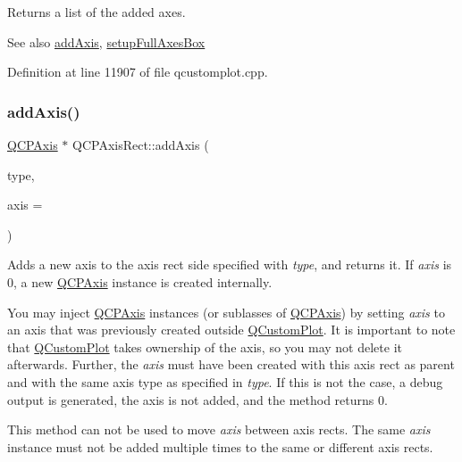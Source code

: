 Returns a list of the added axes.

\begin{DoxySeeAlso}{See also}
\hyperlink{class_q_c_p_axis_rect_a2dc336092ccc57d44a46194c8a23e4f4}{add\+Axis}, \hyperlink{class_q_c_p_axis_rect_a5fa906175447b14206954f77fc7f1ef4}{setup\+Full\+Axes\+Box} 
\end{DoxySeeAlso}


Definition at line 11907 of file qcustomplot.\+cpp.

\mbox{\label{class_q_c_p_axis_rect_a2dc336092ccc57d44a46194c8a23e4f4}} 
\subsubsection{\texorpdfstring{add\+Axis()}{addAxis()}}
{\footnotesize\ttfamily \hyperlink{class_q_c_p_axis}{Q\+C\+P\+Axis} $\ast$ Q\+C\+P\+Axis\+Rect\+::add\+Axis (\begin{DoxyParamCaption}\item[{\hyperlink{class_q_c_p_axis_ae2bcc1728b382f10f064612b368bc18a}{Q\+C\+P\+Axis\+::\+Axis\+Type}}]{type,  }\item[{\hyperlink{class_q_c_p_axis}{Q\+C\+P\+Axis} $\ast$}]{axis = {} }\end{DoxyParamCaption})}

Adds a new axis to the axis rect side specified with {\itshape type}, and returns it. If {\itshape axis} is 0, a new \hyperlink{class_q_c_p_axis}{Q\+C\+P\+Axis} instance is created internally.

You may inject \hyperlink{class_q_c_p_axis}{Q\+C\+P\+Axis} instances (or sublasses of \hyperlink{class_q_c_p_axis}{Q\+C\+P\+Axis}) by setting {\itshape axis} to an axis that was previously created outside \hyperlink{class_q_custom_plot}{Q\+Custom\+Plot}. It is important to note that \hyperlink{class_q_custom_plot}{Q\+Custom\+Plot} takes ownership of the axis, so you may not delete it afterwards. Further, the {\itshape axis} must have been created with this axis rect as parent and with the same axis type as specified in {\itshape type}. If this is not the case, a debug output is generated, the axis is not added, and the method returns 0.

This method can not be used to move {\itshape axis} between axis rects. The same {\itshape axis} instance must not be added multiple times to the same or different axis rects.

